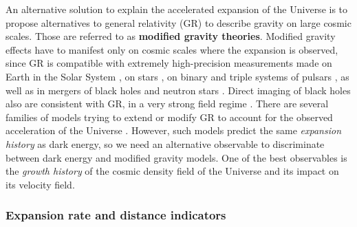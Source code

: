 An alternative solution to explain the accelerated expansion of the Universe 
is to propose alternatives to general relativity (GR) to describe gravity on large cosmic 
scales. Those are referred to as \textbf{modified gravity theories}. 
Modified gravity effects have to manifest only on cosmic scales where 
the expansion is observed, 
since GR is compatible with extremely high-precision measurements made on Earth 
\cite{poundEffectGravityNuclear1964,
hafeleAroundtheWorldAtomicClocks1972,
hafeleAroundtheWorldAtomicClocks1972a,
vessotTestRelativisticGravitation1980,
kapnerTestsGravitationalInverseSquare2007}
in the Solar System 
\cite{shapiroFourthTestGeneral1971,
titovDeflectionLightInduced2015}, 
on stars 
\cite{joyceGravitationalRedshiftSirius2018,
gravitycollaborationDetectionGravitationalRedshift2018}, 
on binary and triple systems of pulsars
\cite{taylorNewTestGeneral1982,
stairsTestingGeneralRelativity2003,
kramerTestsGeneralRelativity2006,
voisinImprovedTestStrong2020}, 
as well as 
in mergers of black holes and neutron stars 
\cite{theligoscientificcollaborationObservationGravitationalWaves2016,
theligoscientificcollaborationGW170817ObservationGravitational2017}. 
Direct imaging of black holes also are consistent
with GR, in a very strong field regime 
\cite{eventhorizontelescopecollaborationFirstM87Event2019}.
There are several families of models trying to extend or modify GR 
to account for 
the observed acceleration of the Universe 
\cite{cliftonModifiedGravityCosmology2012,
zhaiClusteringLuminousRed2017,
ezquiagaDarkEnergyLight2018,
ferreiraCosmologicalTestsGravity2019,
houCosmologicalProbesStructure2023}.
However, such models predict the same \textit{expansion history} as dark energy, 
so we need an alternative observable to discriminate between dark energy and 
modified gravity models. One of the best observables is 
the \textit{growth history} of 
the cosmic density field of the Universe
and its impact on its velocity field. 

\subsubsection*{Expansion rate and distance indicators}

